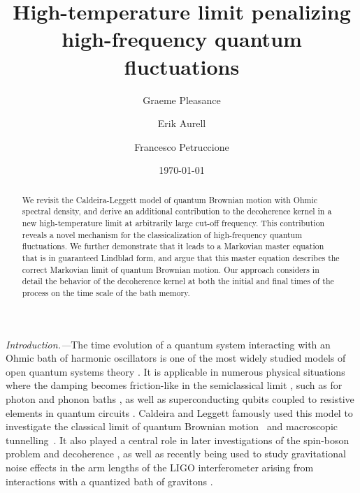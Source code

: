 \documentclass[prl,twocolumn,superscriptaddress,amsmath,amssymb]{revtex4-2}
\begin{document}
\title{High-temperature limit penalizing high-frequency quantum fluctuations}

\author{Graeme Pleasance}
\author{Erik Aurell}
\author{Francesco Petruccione}
\date{\today}


\begin{abstract}
We revisit the Caldeira-Leggett model of quantum Brownian motion with Ohmic spectral density, and derive an additional contribution to the decoherence kernel in a new high-temperature limit at arbitrarily large cut-off frequency. This contribution reveals a novel mechanism for the classicalization of high-frequency quantum fluctuations. We further demonstrate that it leads to a Markovian master equation that is in guaranteed Lindblad form, and argue that this master equation describes the correct Markovian limit of quantum Brownian motion. Our approach considers in detail the behavior of the decoherence kernel at both the initial and final times of the process on the time scale of the bath memory.
\end{abstract}

\maketitle

{\it Introduction.---}The time evolution of a quantum system interacting with an Ohmic bath of harmonic oscillators is one of the most widely studied models of open quantum systems theory \cite{BP2002}. It is applicable in numerous physical situations where the damping becomes friction-like in the semiclassical limit \cite{Weiss2011}, such as for photon and phonon baths \cite{Wilner2015}, as well as superconducting qubits coupled to resistive elements in quantum circuits \cite{Leppakangas2018}. Caldeira and Leggett famously used this model to investigate the classical limit of quantum Brownian motion~\cite{CaldeiraLeggettA} and macroscopic tunnelling~\cite{Caldeira1981, CaldeiraLeggettB}. It also played a central role in later investigations of the spin-boson problem \cite{SpinBoson} and decoherence \cite{Unruh1989,Zurek1993,Paz1993}, as well as recently being used to study gravitational noise effects in the arm lengths of the LIGO interferometer arising from interactions with a quantized bath of gravitons \cite{ParikhWilczekZahariade2020}.
\end{document}
